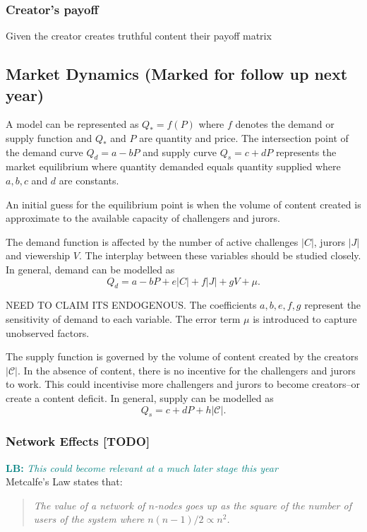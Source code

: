 \documentclass{article}
\newcommand{\lucas}[1]{\textcolor{teal}{\textbf{LB: }\textit{#1}}}
\begin{document}
\subsubsection{Creator's payoff}

Given the creator creates truthful content their payoff matrix

\subsection{Market Dynamics (Marked for follow up next year)}


A model can be represented as $Q_* = f(P)$ where $f$ denotes the demand or supply function and $Q_*$ and $P$ are quantity and price. The intersection point of the demand curve $Q_d = a-bP$ and supply curve $Q_s = c + dP$ represents the market equilibrium where quantity demanded equals quantity supplied where $a, b, c$ and $d$ are constants.

An initial guess for the equilibrium point is when the volume of content created is approximate to the available capacity of challengers and jurors.

The demand function is affected by the number of active challenges $|C|$, jurors $|J|$ and viewership $V$. The interplay between these variables should be studied closely. In general, demand can be modelled as
\begin{equation}
    Q_d = a - bP + e|C| + f|J| + gV + \mu.
\end{equation}

NEED TO CLAIM ITS ENDOGENOUS.
The coefficients $a, b, e, f, g$ represent the sensitivity of demand to each variable. The error term $\mu$ is introduced to capture unobserved factors.

The supply function is governed by the volume of content created by the creators $|\mathcal{C}|$. In the absence of content, there is no incentive for the challengers and jurors to work. This could incentivise more challengers and jurors to become creators--or create a content deficit. In general, supply can be modelled as
\begin{equation}
    Q_s = c + dP + h |\mathcal{C}|.
\end{equation}

\subsubsection{Network Effects [TODO]}

\lucas{This could become relevant at a much later stage this year} \\
Metcalfe's Law \cite{metcalfe2013} states that:
\begin{center}
\begin{quote}
    \emph{The value of a network of $n$-nodes goes up as the square of the number of users of the system where $n(n-1)/2 \propto n^2$.}
\end{quote}
\end{center}
\end{document}
